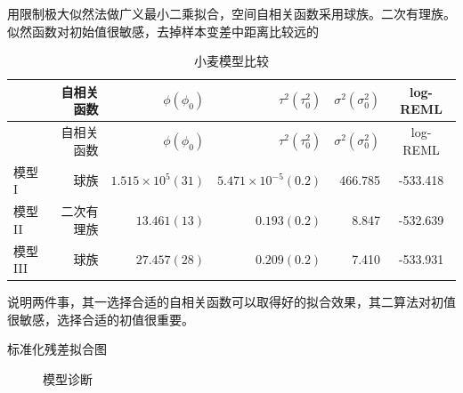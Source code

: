 \documentclass[12pt,a4paper,UTF8,twoside]{book}
\theoremstyle{definition}
\theoremstyle{definition}
\theoremstyle{definition}
\theoremstyle{remark}
\begin{document}
用限制极大似然法做广义最小二乘拟合，空间自相关函数采用球族。二次有理族。似然函数对初始值很敏感，去掉样本变差中距离比较远的

\begin{longtable}[]{@{}lrrrrc@{}}
\caption{\label{tab:yields-model-compare} 小麦模型比较}\tabularnewline
\toprule
& 自相关函数 & \(\phi(\phi_0)\) & \(\tau^2(\tau^2_{0})\) &
\(\sigma^2(\sigma^2_{0})\) & log-REML\tabularnewline
\midrule
\endfirsthead
\toprule
& 自相关函数 & \(\phi(\phi_0)\) & \(\tau^2(\tau^2_{0})\) &
\(\sigma^2(\sigma^2_{0})\) & log-REML\tabularnewline
\midrule
\endhead
模型 I & 球族 & \(1.515\times 10^{5}(31)\) &
\(5.471\times 10^{-5}(0.2)\) & 466.785 & -533.418\tabularnewline
模型 II & 二次有理族 & \(13.461(13)\) & \(0.193(0.2)\) & 8.847 &
-532.639\tabularnewline
模型 III & 球族 & \(27.457(28)\) & \(0.209(0.2)\) & 7.410 &
-533.931\tabularnewline
\bottomrule
\end{longtable}

说明两件事，其一选择合适的自相关函数可以取得好的拟合效果，其二算法对初值很敏感，选择合适的初值很重要。

标准化残差拟合图

\begin{figure}

{\centering {}

}

\caption{模型诊断}\label{fig:model-check}
\end{figure}
\end{document}
